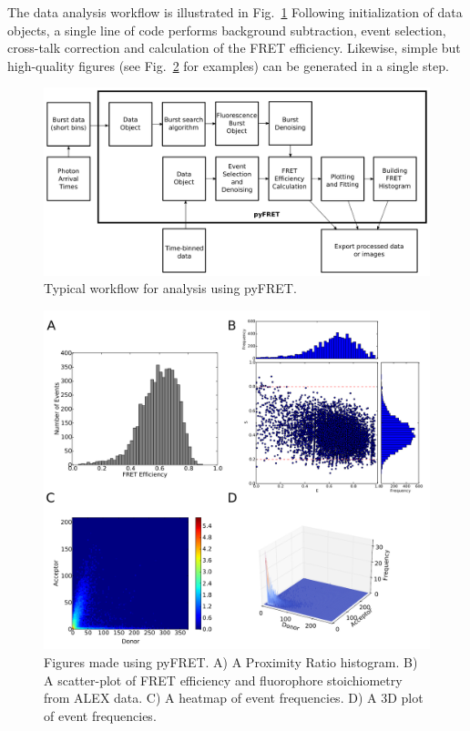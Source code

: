 The data analysis workflow is illustrated in Fig.~\ref{fig:fig2_workflow} Following initialization of data objects, a single line of code performs background subtraction, event selection, cross-talk correction and calculation of the FRET efficiency. Likewise, simple but high-quality figures (see Fig.~\ref{fig:fig3_sample_results} for examples) can be generated in a single step.

\begin{figure}[!ht]
   \begin{center}
      \includegraphics*[clip=true, width=6in]{pyFRET/workflow.pdf}
      \caption{Typical workflow for analysis using pyFRET.}
      \label{fig:fig2_workflow}
   \end{center}
\end{figure}

\begin{figure}[!ht]
   \begin{center}
      \includegraphics*[clip=true, width=6in]{pyFRET/6bp_example.pdf}
      \caption{Figures made using pyFRET. A) A Proximity Ratio histogram. B) A scatter-plot of FRET efficiency and fluorophore stoichiometry from ALEX data. C) A heatmap of event frequencies.  D) A 3D plot of event frequencies.}
      \label{fig:fig3_sample_results}
   \end{center}
\end{figure}


